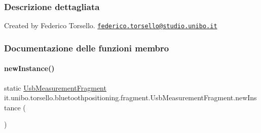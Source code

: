 \subsubsection{Descrizione dettagliata}
Created by Federico Torsello. \href{mailto:federico.torsello@studio.unibo.it}{\tt federico.\+torsello@studio.\+unibo.\+it} 

\subsubsection{Documentazione delle funzioni membro}
\hypertarget{classit_1_1unibo_1_1torsello_1_1bluetoothpositioning_1_1fragment_1_1UsbMeasurementFragment_a67f1c1cdd2ff81d5345f358dcaf27751_a67f1c1cdd2ff81d5345f358dcaf27751}{}\label{classit_1_1unibo_1_1torsello_1_1bluetoothpositioning_1_1fragment_1_1UsbMeasurementFragment_a67f1c1cdd2ff81d5345f358dcaf27751_a67f1c1cdd2ff81d5345f358dcaf27751} 
\paragraph{\texorpdfstring{new\+Instance()}{newInstance()}}
{\footnotesize\ttfamily static \hyperlink{classit_1_1unibo_1_1torsello_1_1bluetoothpositioning_1_1fragment_1_1UsbMeasurementFragment}{Usb\+Measurement\+Fragment} it.\+unibo.\+torsello.\+bluetoothpositioning.\+fragment.\+Usb\+Measurement\+Fragment.\+new\+Instance (\begin{DoxyParamCaption}{ }\end{DoxyParamCaption})\hspace{0.3cm}{\ttfamily [static]}}


